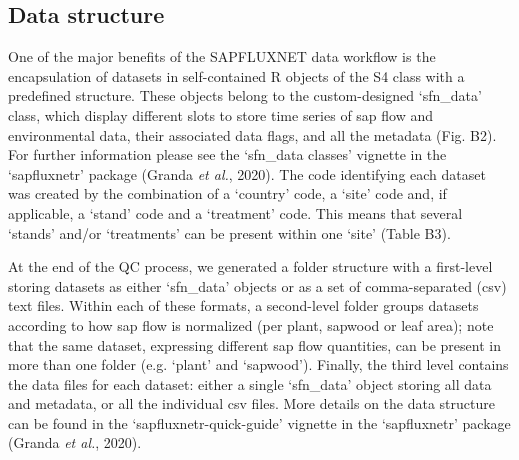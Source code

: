 \documentclass[11pt,twoside]{reedthesis}
\begin{document}
\subsection{Data structure}\label{data-structure}

One of the major benefits of the SAPFLUXNET data workflow is the
encapsulation of datasets in self-contained R objects of the S4 class
with a predefined structure. These objects belong to the custom-designed
`sfn\_data' class, which display different slots to store time series of
sap flow and environmental data, their associated data flags, and all
the metadata (Fig. B2). For further information please see the
`sfn\_data classes' vignette in the `sapfluxnetr' package (Granda
\emph{et al.}, 2020). The code identifying each dataset was created by
the combination of a `country' code, a `site' code and, if applicable, a
`stand' code and a `treatment' code. This means that several `stands'
and/or `treatments' can be present within one `site' (Table B3).\par

At the end of the QC process, we generated a folder structure with a
first-level storing datasets as either `sfn\_data' objects or as a set
of comma-separated (csv) text files. Within each of these formats, a
second-level folder groups datasets according to how sap flow is
normalized (per plant, sapwood or leaf area); note that the same
dataset, expressing different sap flow quantities, can be present in
more than one folder (e.g. `plant' and `sapwood'). Finally, the third
level contains the data files for each dataset: either a single
`sfn\_data' object storing all data and metadata, or all the individual
csv files. More details on the data structure can be found in the
`sapfluxnetr-quick-guide' vignette in the `sapfluxnetr' package (Granda
\emph{et al.}, 2020).\par
\end{document}
